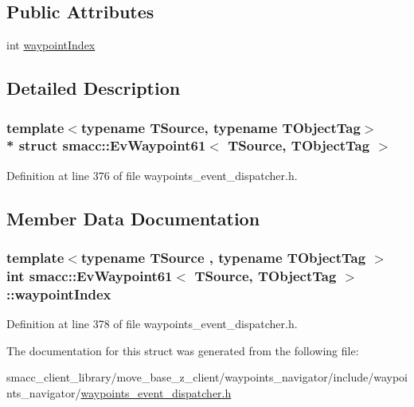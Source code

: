 \subsection*{Public Attributes}
\begin{DoxyCompactItemize}
\item 
int \hyperlink{structsmacc_1_1EvWaypoint61_a0fc83112a1f9664e9b5cdd8514ee4905}{waypoint\+Index}
\end{DoxyCompactItemize}


\subsection{Detailed Description}
\subsubsection*{template$<$typename T\+Source, typename T\+Object\+Tag$>$\\*
struct smacc\+::\+Ev\+Waypoint61$<$ T\+Source, T\+Object\+Tag $>$}



Definition at line 376 of file waypoints\+\_\+event\+\_\+dispatcher.\+h.



\subsection{Member Data Documentation}
\subsubsection[{\texorpdfstring{waypoint\+Index}{waypointIndex}}]{\setlength{\rightskip}{0pt plus 5cm}template$<$typename T\+Source , typename T\+Object\+Tag $>$ int {\bf smacc\+::\+Ev\+Waypoint61}$<$ T\+Source, T\+Object\+Tag $>$\+::waypoint\+Index}\hypertarget{structsmacc_1_1EvWaypoint61_a0fc83112a1f9664e9b5cdd8514ee4905}{}\label{structsmacc_1_1EvWaypoint61_a0fc83112a1f9664e9b5cdd8514ee4905}


Definition at line 378 of file waypoints\+\_\+event\+\_\+dispatcher.\+h.



The documentation for this struct was generated from the following file\+:\begin{DoxyCompactItemize}
\item 
smacc\+\_\+client\+\_\+library/move\+\_\+base\+\_\+z\+\_\+client/waypoints\+\_\+navigator/include/waypoints\+\_\+navigator/\hyperlink{waypoints__event__dispatcher_8h}{waypoints\+\_\+event\+\_\+dispatcher.\+h}\end{DoxyCompactItemize}
